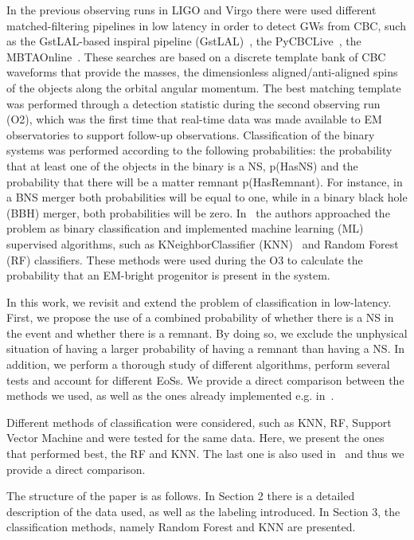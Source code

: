 
   
 
In the previous observing runs in LIGO and Virgo there were used different matched-filtering pipelines in low latency in order to detect GWs from CBC, such as the GstLAL-based inspiral pipeline (GstLAL)~\cite{Sachdev:2020lfd}, the PyCBCLive~\cite{Nitz_2018}, the MBTAOnline~\cite{Adams_2016}. These searches are based on a discrete template bank of CBC waveforms that provide the masses, the dimensionless aligned/anti-aligned spins of the objects along the orbital angular momentum. The best matching template was performed through a detection statistic during the second observing run (O2), which was the first time that real-time data was made available to EM observatories to support follow-up observations. Classification of the binary systems was performed according to the following probabilities: the probability that at least one of the objects in the binary is a NS, p(HasNS) and the probability that there will be a matter remnant p(HasRemnant). For instance, in a BNS merger both probabilities will be equal to one, while in a binary black hole (BBH) merger, both probabilities will be zero. In~\cite{Chatterjee:2019avs} the authors approached the problem as binary classification and implemented machine learning (ML) supervised algorithms, such as KNeighborClassifier (KNN)~\cite{Pedregosa:2011ork} and Random Forest (RF) classifiers. These methods were used during the O3 to calculate the probability that an EM-bright progenitor is present in the system.


In this work, we revisit and extend the problem of classification in low-latency. First, we propose the use of a combined probability of whether there is a NS in the event and whether there is a remnant. By doing so, we exclude the unphysical situation of having a larger probability of having a remnant than having a NS. In addition, we perform a thorough study of different algorithms, perform several tests and account for different EoSs. We provide a direct comparison between the methods we used, as well as the ones already implemented e.g. in~\cite{Chatterjee:2019avs}. 

Different methods of classification were considered, such as KNN, RF, Support Vector Machine and were tested for the same data. Here, we present the ones that performed best, the RF and KNN. The last one is also used in~\cite{Chatterjee:2019avs} and thus we provide a direct comparison. 

The structure of the paper is as follows. In Section 2 there is a detailed description of the data used, as well as the labeling introduced. In Section 3, the classification methods, namely Random Forest and KNN are presented. 
